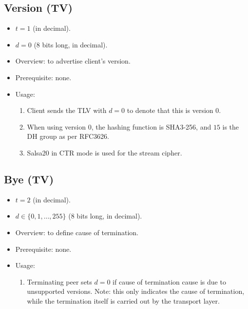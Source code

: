\documentclass{article}
\begin{document}
\subsection{Version (TV)}
\begin{itemize}
    \item $t = 1$ (in decimal).
    \item $d = 0$ (8 bits long, in decimal).
    \item Overview: to advertise client's version. 
    \item Prerequisite: none.
    \item Usage:
        \begin{enumerate}
            \item Client sends the TLV with $d=0$ to denote that this is
            version 0.
            \item When using version $0$, the hashing function is SHA3-256, and
            $15$ is the DH group as per RFC3626.
            \item Salsa20 in CTR mode is used for the stream cipher.
        \end{enumerate}
\end{itemize}

\subsection{Bye (TV)}
\begin{itemize}
    \item $t = 2$ (in decimal).
    \item $d \in \{0,1,\ldots,255\}$ (8 bits long, in decimal).
    \item Overview: to define cause of termination. 
    \item Prerequisite: none.
    \item Usage:
        \begin{enumerate}
            \item Terminating peer sets $d=0$ if cause of termination cause is
            due to unsupported versions. Note: this only indicates the cause of
            termination, while the termination itself is carried out by the
            transport layer.
        \end{enumerate}
\end{itemize}
\end{document}
